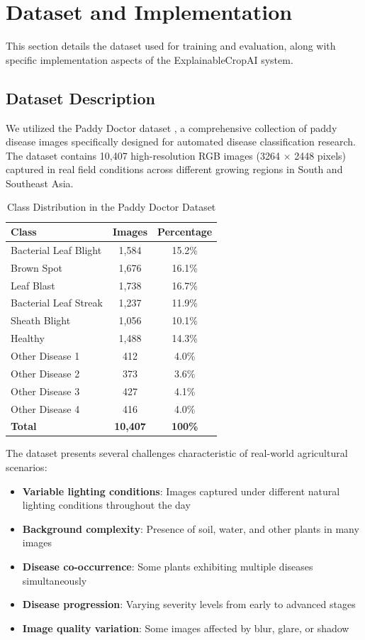\section{Dataset and Implementation}

This section details the dataset used for training and evaluation, along with specific implementation aspects of the ExplainableCropAI system.

\subsection{Dataset Description}

We utilized the Paddy Doctor dataset \cite{das2020paddy}, a comprehensive collection of paddy disease images specifically designed for automated disease classification research. The dataset contains 10,407 high-resolution RGB images (3264 $\times$ 2448 pixels) captured in real field conditions across different growing regions in South and Southeast Asia.

\begin{table}[h]
\centering
\caption{Class Distribution in the Paddy Doctor Dataset}
\label{tab:dataset-distribution}
\begin{tabular}{lcc}
\hline
\textbf{Class} & \textbf{Images} & \textbf{Percentage} \\
\hline
Bacterial Leaf Blight & 1,584 & 15.2\% \\
Brown Spot & 1,676 & 16.1\% \\
Leaf Blast & 1,738 & 16.7\% \\
Bacterial Leaf Streak & 1,237 & 11.9\% \\
Sheath Blight & 1,056 & 10.1\% \\
Healthy & 1,488 & 14.3\% \\
Other Disease 1 & 412 & 4.0\% \\
Other Disease 2 & 373 & 3.6\% \\
Other Disease 3 & 427 & 4.1\% \\
Other Disease 4 & 416 & 4.0\% \\
\hline
\textbf{Total} & \textbf{10,407} & \textbf{100\%} \\
\hline
\end{tabular}
\end{table}

The dataset presents several challenges characteristic of real-world agricultural scenarios:

\begin{itemize}
    \item \textbf{Variable lighting conditions}: Images captured under different natural lighting conditions throughout the day
    \item \textbf{Background complexity}: Presence of soil, water, and other plants in many images
    \item \textbf{Disease co-occurrence}: Some plants exhibiting multiple diseases simultaneously
    \item \textbf{Disease progression}: Varying severity levels from early to advanced stages
    \item \textbf{Image quality variation}: Some images affected by blur, glare, or shadow
\end{itemize}


